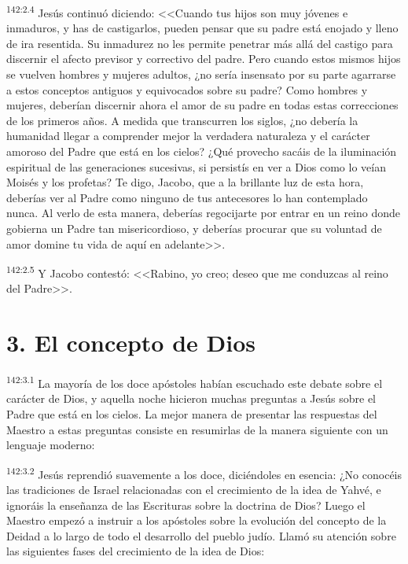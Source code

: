 \par 
\textsuperscript{142:2.4} Jesús continuó diciendo: <<Cuando tus hijos son muy jóvenes e inmaduros, y has de castigarlos, pueden pensar que su padre está enojado y lleno de ira resentida. Su inmadurez no les permite penetrar más allá del castigo para discernir el afecto previsor y correctivo del padre. Pero cuando estos mismos hijos se vuelven hombres y mujeres adultos, ¿no sería insensato por su parte agarrarse a estos conceptos antiguos y equivocados sobre su padre? Como hombres y mujeres, deberían discernir ahora el amor de su padre en todas estas correcciones de los primeros años. A medida que transcurren los siglos, ¿no debería la humanidad llegar a comprender mejor la verdadera naturaleza y el carácter amoroso del Padre que está en los cielos? ¿Qué provecho sacáis de la iluminación espiritual de las generaciones sucesivas, si persistís en ver a Dios como lo veían Moisés y los profetas? Te digo, Jacobo, que a la brillante luz de esta hora, deberías ver al Padre como ninguno de tus antecesores lo han contemplado nunca. Al verlo de esta manera, deberías regocijarte por entrar en un reino donde gobierna un Padre tan misericordioso, y deberías procurar que su voluntad de amor domine tu vida de aquí en adelante>>.

\par 
\textsuperscript{142:2.5} Y Jacobo contestó: <<Rabino, yo creo; deseo que me conduzcas al reino del Padre>>.

\section*{3. El concepto de Dios}
\par 
\textsuperscript{142:3.1} La mayoría de los doce apóstoles habían escuchado este debate sobre el carácter de Dios, y aquella noche hicieron muchas preguntas a Jesús sobre el Padre que está en los cielos. La mejor manera de presentar las respuestas del Maestro a estas preguntas consiste en resumirlas de la manera siguiente con un lenguaje moderno:

\par 
\textsuperscript{142:3.2} Jesús reprendió suavemente a los doce, diciéndoles en esencia: ¿No conocéis las tradiciones de Israel relacionadas con el crecimiento de la idea de Yahvé, e ignoráis la enseñanza de las Escrituras sobre la doctrina de Dios? Luego el Maestro empezó a instruir a los apóstoles sobre la evolución del concepto de la Deidad a lo largo de todo el desarrollo del pueblo judío. Llamó su atención sobre las siguientes fases del crecimiento de la idea de Dios:

